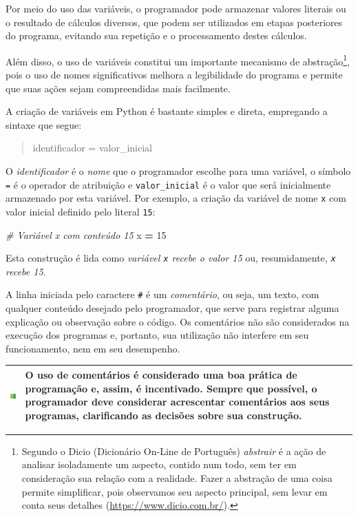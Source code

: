 \documentclass[
]{book}
\newenvironment{Shaded}{\begin{snugshade}}{\end{snugshade}}
\newcommand{\CommentTok}[1]{\textcolor[rgb]{0.56,0.35,0.01}{\textit{#1}}}
\newcommand{\DecValTok}[1]{\textcolor[rgb]{0.00,0.00,0.81}{#1}}
\newcommand{\NormalTok}[1]{#1}
\newcommand{\OperatorTok}[1]{\textcolor[rgb]{0.81,0.36,0.00}{\textbf{#1}}}
\begin{document}
Por meio do uso das variáveis, o programador pode armazenar valores literais ou o resultado de cálculos diversos, que podem ser utilizados em etapas posteriores do programa, evitando sua repetição e o processamento destes cálculos.

Além disso, o uso de variáveis constitui um importante mecanismo de abstração\footnote{Segundo o Dicio (Dicionário On-Line de Português) \emph{abstrair} é a ação de analisar isoladamente um aspecto, contido num todo, sem ter em consideração sua relação com a realidade. Fazer a abstração de uma coisa permite simplificar, pois observamos seu aspecto principal, sem levar em conta seus detalhes (\url{https://www.dicio.com.br/}).}, pois o uso de nomes significativos melhora a legibilidade do programa e permite que suas ações sejam compreendidas mais facilmente.

A criação de variáveis em Python é bastante simples e direta, empregando a sintaxe que segue:

\begin{quote}
identificador = valor\_inicial
\end{quote}

O \emph{identificador} é o \emph{nome} que o programador escolhe para uma variável, o símbolo \texttt{=} é o operador de atribuição e \texttt{valor\_inicial} é o valor que será inicialmente armazenado por esta variável. Por exemplo, a criação da variável de nome \texttt{x} com valor inicial definido pelo literal \texttt{15}:

\begin{Shaded}
\begin{Highlighting}[]
\CommentTok{\# Variável x com conteúdo 15}
\NormalTok{x }\OperatorTok{=} \DecValTok{15}
\end{Highlighting}
\end{Shaded}

Esta construção é lida como \emph{variável \texttt{x} recebe o valor 15} ou, resumidamente, \emph{\texttt{x} recebe 15}.

A linha iniciada pelo caractere \texttt{\#} é um \emph{comentário}, ou seja, um texto, com qualquer conteúdo desejado pelo programador, que serve para registrar alguma explicação ou observação sobre o código. Os comentários não são considerados na execução dos programas e, portanto, sua utilização não interfere em seu funcionamento, nem em seu desempenho.

\begin{longtable}[]{@{}
  >{\centering\arraybackslash}p{}
  >{\raggedright\arraybackslash}p{}@{}}
\toprule
\includegraphics{images/do.png} & O uso de comentários é considerado uma boa prática de programação e, assim, é incentivado. Sempre que possível, o programador deve considerar acrescentar comentários aos seus programas, clarificando as decisões sobre sua construção. \\
\midrule
\endhead
\bottomrule
\end{longtable}
\end{document}
